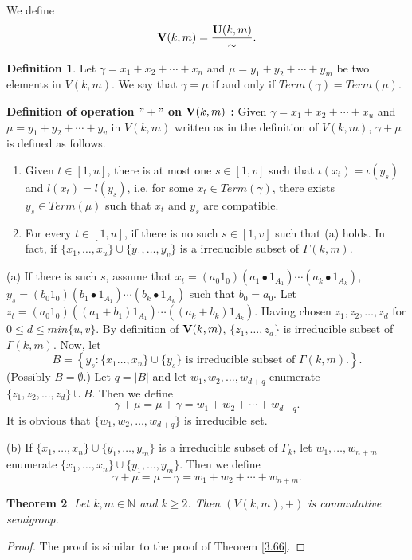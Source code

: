 \documentclass{amsart}
\newtheorem{theorem}{Theorem}[section]
\theoremstyle{definition}
\newtheorem{definition}[theorem]{Definition}
\theoremstyle{remark}
\numberwithin{equation}{section}
\newcommand{\V}{{\bf{V}}}
\newcommand{\U}{{\bf{U}}}
\begin{document}
We define 
\[
\V(k,m)=\frac{\U(k,m)}{\sim}.
\]
\begin{definition}
	Let \( \gamma = x_1 + x_2 + \cdots + x_n \) and \( \mu = y_1 + y_2 + \cdots + y_m \) be two elements in \( V(k,m) \). We say that \( \gamma = \mu \) if and only if $Term(\gamma)=Term(\mu)$. 
\end{definition}
{\bf{ Definition of operation $"+"$ on $\V(k,m)$ :}} Given \( \gamma = x_1 + x_2 + \cdots + x_u \) and \( \mu = y_1 + y_2 + \cdots + y_v \) in \( V(k,m) \) written as in the definition of \( V(k,m) \), \( \gamma + \mu \) is defined as follows.
\begin{enumerate}
	
	\item[(a)] 	Given \( t \in [1,u] \), there is at most one \( s \in [1,v] \) such that \( \iota(x_t) = \iota(y_s) \) and \( l(x_t) = l(y_s) \), i.e. for some $x_t\in Term(\gamma)$, there exists $y_s\in Term(\mu)$ such that $x_t$ and $y_s$ are compatible.
	
	\item[(b)] For every \( t \in [1,u] \), if there is no such \( s \in [1,v] \) such that (a) holds. In fact, if  $\{x_1,\ldots,x_u\}\cup\{y_1,\ldots,y_v\}$ is a irreducible subset of $\Gamma(k,m)$.
\end{enumerate}
(a) If there is such \( s \), assume that $x_t = (a_0 1_0)(a_1\bullet 1_{A_1})\cdots(a_k\bullet 1_{A_k})$, $ y_s = (b_0 1_0)(b_1\bullet 1_{A_1})\cdots(b_k\bullet 1_{A_k})$ such that \( b_0 = a_0 \). Let $z_t = (a_0 1_0)((a_1 + b_1) 1_{A_1}) \cdots ((a_k + b_k) 1_{A_k})$. Having chosen \( z_1, z_2, \ldots, z_d \) for $0\leq d\leq min\{u,v\}$. By definition of $\V(k,m)$, $\{z_1,\ldots,z_d\}$ is irreducible subset of $\Gamma(k,m)$. Now, let
\[
B = \left\{ y_s :\{x_1\ldots,x_n\}\cup\{y_s\}\text{ is irreducible subset of }\Gamma(k,m). \right\}.
\]
(Possibly \( B = \emptyset \).) 	Let \( q = |B| \) and let \( w_1, w_2, \ldots, w_{d+q} \) enumerate \( \{z_1, z_2, \ldots, z_d\} \cup B \). Then we define
\[
\gamma + \mu = \mu + \gamma = w_1 + w_2 + \cdots + w_{d+q}.
\]
It is obvious that $\{w_1,w_2,\ldots,w_{d+q}\}$ is irreducible set.

(b) If $\{x_1,\ldots,x_n\}\cup\{y_1,\ldots,y_m\}$ is a irreducible subset of $\Gamma_k$, let $w_1,\ldots,w_{n+m}$ enumerate $\{x_1,\ldots,x_n\}\cup\{y_1,\ldots,y_m\}$. Then we define 
\[
\gamma+\mu=\mu+\gamma=w_1+w_2+\cdots+w_{n+m}.
\]
\begin{theorem}
	Let $k,m\in\mathbb{N}$ and $k\geq 2$. Then $(V(k,m),+)$ is commutative semigroup.
\end{theorem}
\begin{proof}
	The proof is similar to the proof of Theorem \ref{3.66}.	
\end{proof}
\end{document}
